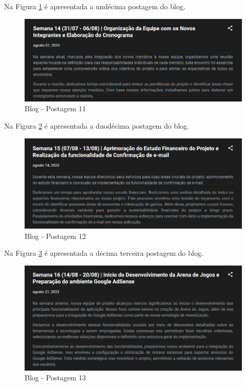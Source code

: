\begin{apendicesenv}
Na Figura \ref{fig:119} é apresentada a undécima postagem do blog.

\begin{figure}[H]
	\centering
	\includegraphics[scale=0.68]{./imagens/Blog11.png}
	\caption{Blog - Postagem 11}
    \label{fig:119}
\end{figure}

Na Figura \ref{fig:120} é apresentada a duodécima postagem do blog.

\begin{figure}[H]
	\centering
	\includegraphics[scale=0.68]{./imagens/Blog12.png}
	\caption{Blog - Postagem 12}
    \label{fig:120}
\end{figure}
\pagebreak

Na Figura \ref{fig:121} é apresentada a décima terceira postagem do blog.

\begin{figure}[H]
	\centering
	\includegraphics[scale=0.68]{./imagens/Blog13.png}
	\caption{Blog - Postagem 13}
    \label{fig:121}
\end{figure}


\end{apendicesenv}
